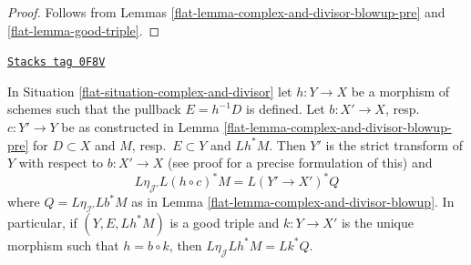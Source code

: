 \begin{proof}

Follows from Lemmas \ref{flat-lemma-complex-and-divisor-blowup-pre}
and \ref{flat-lemma-good-triple}.
\end{proof}

\begin{lemma}
\label{flat-lemma-complex-and-divisor-blowup-base-change}
\href{https://stacks.math.columbia.edu/tag/0F8V}{\texttt{Stacks tag 0F8V}}

In Situation \ref{flat-situation-complex-and-divisor} let $h : Y \to X$
be a morphism of schemes such that the pullback $E = h^{-1}D$
is defined. Let $b : X' \to X$, resp.\ $c : Y' \to Y$ be as constructed in
Lemma \ref{flat-lemma-complex-and-divisor-blowup-pre} for
$D \subset X$ and $M$, resp.\ $E \subset Y$ and $Lh^*M$.
Then $Y'$ is the strict transform of $Y$ with respect to $b : X' \to X$
(see proof for a precise formulation of this) and
$$
L\eta_{\mathcal{J}'}L(h \circ c)^*M = L(Y' \to X')^*Q
$$
where $Q = L\eta_{\mathcal{I}'}Lb^*M$ as in
Lemma \ref{flat-lemma-complex-and-divisor-blowup}.
In particular, if $(Y, E, Lh^*M)$ is a good triple and
$k : Y \to X'$ is the unique morphism such that
$h = b \circ k$, then $L\eta_\mathcal{J}Lh^*M = Lk^*Q$.
\end{lemma}

